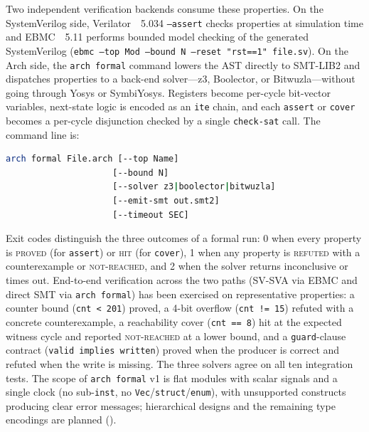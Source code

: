 \documentclass[11pt,twocolumn]{article}
\begin{document}
Two independent verification backends consume these properties. On the SystemVerilog side, Verilator~\cite{verilator}~5.034 \texttt{--assert} checks properties at simulation time and EBMC~\cite{ebmc}~5.11 performs bounded model checking of the generated SystemVerilog (\texttt{ebmc --top Mod --bound N --reset "rst==1" file.sv}). On the Arch side, the \texttt{arch formal} command lowers the AST directly to SMT-LIB2 and dispatches properties to a back-end solver---z3, Boolector, or Bitwuzla---without going through Yosys or SymbiYosys. Registers become per-cycle bit-vector variables, next-state logic is encoded as an \texttt{ite} chain, and each \texttt{assert} or \texttt{cover} becomes a per-cycle disjunction checked by a single \texttt{check-sat} call. The command line is:

\begin{lstlisting}[language=bash]
arch formal File.arch [--top Name]
                     [--bound N]
                     [--solver z3|boolector|bitwuzla]
                     [--emit-smt out.smt2]
                     [--timeout SEC]
\end{lstlisting}

Exit codes distinguish the three outcomes of a formal run: 0 when every property is \textsc{proved} (for \texttt{assert}) or \textsc{hit} (for \texttt{cover}), 1 when any property is \textsc{refuted} with a counterexample or \textsc{not-reached}, and 2 when the solver returns inconclusive or times out. End-to-end verification across the two paths (SV-SVA via EBMC and direct SMT via \texttt{arch formal}) has been exercised on representative properties: a counter bound (\texttt{cnt < 201}) proved, a 4-bit overflow (\texttt{cnt != 15}) refuted with a concrete counterexample, a reachability cover (\texttt{cnt == 8}) hit at the expected witness cycle and reported \textsc{not-reached} at a lower bound, and a \texttt{guard}-clause contract (\texttt{valid implies written}) proved when the producer is correct and refuted when the write is missing. The three solvers agree on all ten integration tests. The scope of \texttt{arch formal} v1 is flat modules with scalar signals and a single clock (no sub-\texttt{inst}, no \texttt{Vec}/\texttt{struct}/\texttt{enum}), with unsupported constructs producing clear error messages; hierarchical designs and the remaining type encodings are planned ().

\end{document}
